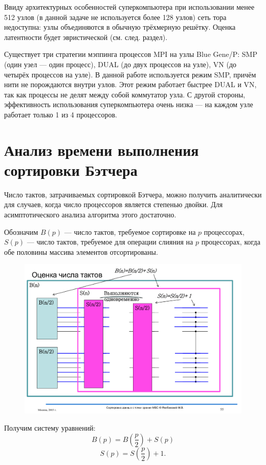 \documentclass[14pt]{extarticle}
\begin{document}
Ввиду архитектурных особенностей суперкомпьютера при использовании менее 512 узлов (в данной задаче не используется более 128 узлов) сеть тора недоступна: узлы объединяются в обычную трёхмерную решётку. Оценка латентности будет эвристической (см. след. раздел).

Существует три стратегии мэппинга процессов MPI на узлы Blue Gene/P: SMP (один узел --- один процесс), DUAL (до двух процессов на узле), VN (до четырёх процессов на узле). В данной работе используется режим SMP, причём нити не порождаются внутри узлов. Этот режим работает быстрее DUAL и VN, так как процессы не делят между собой коммутатор узла. С другой стороны, эффективность использования суперкомпьютера очень низка --- на каждом узле работает только 1 из 4 процессоров.

\section{Анализ времени выполнения сортировки Бэтчера}
Число тактов, затрачиваемых сортировкой Бэтчера, можно получить аналитически для случаев, когда число процессоров является степенью двойки. Для асимптотического анализа алгоритма этого достаточно.

Обозначим $B(p)$ --- число тактов, требуемое сортировке на $p$ процессорах, $S(p)$ --- число тактов, требуемое для операции слияния на $p$ процессорах, когда обе половины массива элементов отсортированы.

\begin{figure}[H]
	\centering
	\includegraphics[scale=0.4]{tacts}
\end{figure}

Получим систему уравнений:
\begin{equation*}
B(p) = B \left( \frac{p}{2} \right) + S(p)
\end{equation*}
\begin{equation*}
S(p) = S \left( \frac{p}{2} \right) + 1.
\end{equation*}
\end{document}
